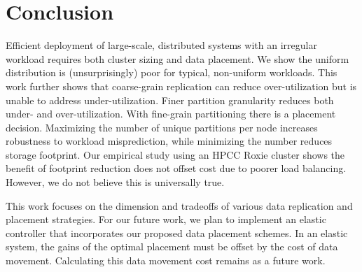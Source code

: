 \section{Conclusion}
\label{sec:conclusion}

Efficient deployment of large-scale, distributed systems with
an irregular workload requires both cluster sizing and data placement.
We show the uniform distribution is (unsurprisingly) poor for
typical, non-uniform workloads.
This work further shows that coarse-grain replication can reduce
over-utilization but is unable to address under-utilization.
Finer partition granularity reduces both under- and
over-utilization.
With fine-grain partitioning there is a placement decision.
Maximizing the number of unique partitions per node increases robustness
to workload misprediction,
while minimizing the number reduces storage
footprint.
Our empirical study using an HPCC Roxie cluster shows
the benefit of footprint reduction does not offset cost due to poorer
load balancing.
However, we do not believe this is universally true.

This work focuses on the dimension and tradeoffs of various data
replication and placement strategies.
For our future work, we plan to implement an elastic controller
that incorporates our proposed data placement schemes.
In an elastic system, the gains of the optimal placement must be
offset by the cost of data movement.
Calculating this data movement cost remains as a future work.
